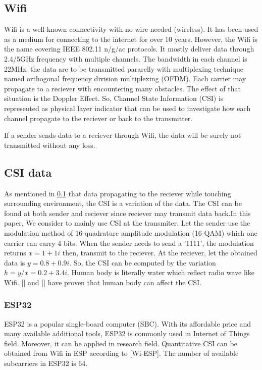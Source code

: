 \documentclass[conference]{IEEEtran}
\begin{document}
	
	\subsection{Wifi}\label{wifi}
	
	Wifi is a well-known connectivity with no wire needed (wireless). It has been used as a medium for connecting to the internet for over 10 years. However, the Wifi is the name covering IEEE 802.11 n/g/ac protocols. It mostly deliver data through 2.4/5GHz frequency with multiple channels. The bandwidth in each channel is 22MHz. the data are to be transmitted  pararelly with multiplexing technique named orthogonal frequency division multiplexing (OFDM). Each carrier may propagate to a reciever with encountering many obstacles. The effect of that situation is the Doppler Effect.
	So, Channel State Information (CSI) is represented as physical layer indicator that can be used to investigate how each channel propagate to the reciever or back to the transmitter.
	
	If a sender sends data to a reciever through Wifi, the data will be surely not transmitted without any loss.
	


	\subsection{CSI data}\label{CSI}
	As mentioned in \ref{wifi} that data propagating to the reciever while touching surrounding environment, the CSI is a variation of the data. The CSI can  be found at both sender and reciever since reciever may transmit data back.In this paper, We consider to mainly use CSI at the transmiter. Let the sender use the modulation method of 16-quadrature amplitude modulation (16-QAM) which one carrier can carry 4 bits. When the sender needs to send a '1111', the modulation returns $x=1+1i$ then, transmit to the reciever. At the reciever, let the obtained data is $y=0.8+0.9i$. So, the CSI can be computed by the variation $h=y/x=0.2+3.4i$.
	Human body is literally water which reflect radio wave like Wifi. [] and [] have proven that human body can affect the CSI.
	
	\subsubsection{ESP32}\label{ESP32}
	ESP32 is a popular single-board computer (SBC). With its affordable price and many available additional tools, ESP32 is commonly used in Internet of Things field. Moreover, it can be applied in research field. Quantitative CSI can be obtained from Wifi in ESP according to [Wi-ESP]. The number of available subcarriers in ESP32 is 64.
	
\end{document}
